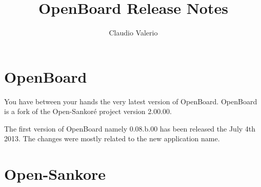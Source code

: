 \documentclass[a4paper]{report}
\begin{document}
\thispagestyle{empty} %
\title{OpenBoard Release Notes}
\author{Claudio Valerio}

\maketitle
\setcounter{page}{1}
\tableofcontents


\pagestyle{fancy}
\chapter*{OpenBoard}
\noindent 

You have between your hands the very latest version of OpenBoard. OpenBoard is a fork of the Open-Sankor\'e project version 2.00.00. \newline

The first version of OpenBoard namely 0.08.b.00 has been released the July 4th 2013. The changes were mostly related to the new application name. 

\setcounter{page}{1}









\chapter*{Open-Sankore}

\end{document}
